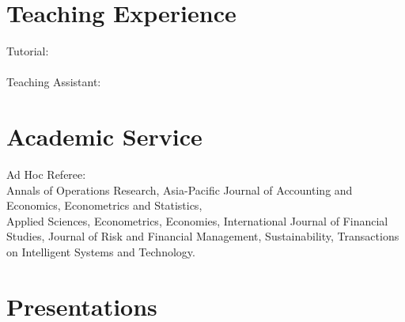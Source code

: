 \documentclass[margin]{res}
\begin{document}
\begin{resume}
		\section{\sc Teaching Experience}
		Tutorial: \\
		\\
		Teaching Assistant: \\
		
		
		\section{\sc Academic Service}
		
		Ad Hoc Referee: \\
		Annals of Operations Research,
		Asia-Pacific Journal of Accounting and Economics,
		Econometrics and Statistics, 
		\\
		Applied Sciences,
		Econometrics,
		Economies, 
		International Journal of Financial Studies,
		Journal of Risk and Financial Management,
		Sustainability,
		Transactions on Intelligent Systems and Technology.
		
		\vspace{5mm}
		
		\section{\sc Presentations}
		

\end{resume}
\end{document}
